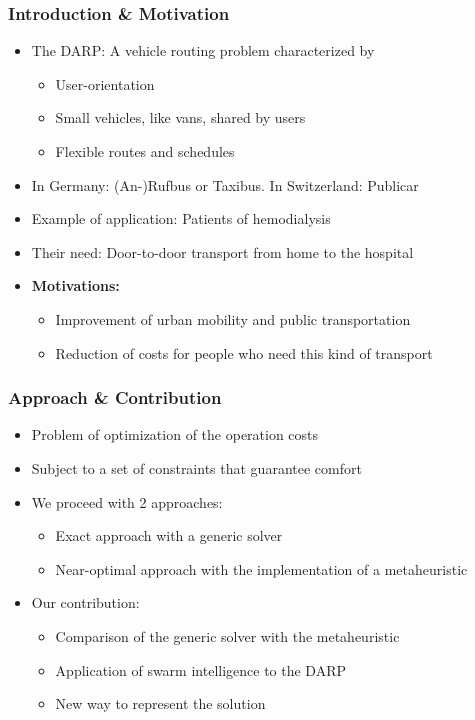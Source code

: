 \documentclass{beamer}
\begin{document}
\begin{frame}
\frametitle{Introduction \& Motivation}
\begin{itemize}
\item The DARP: A vehicle routing problem characterized by
	\begin{itemize}
	\item User-orientation
	\item Small vehicles, like vans, shared by users
	\item Flexible routes and schedules
	\end{itemize}
\item In Germany: (An-)Rufbus or Taxibus. In Switzerland: Publicar
\item Example of application: Patients of hemodialysis
\item Their need: Door-to-door transport from home to the hospital
\pause
\item \textbf{Motivations:}
	\begin{itemize}
	\item Improvement of urban mobility and public transportation
	\item Reduction of costs for people who need this kind of transport
	\end{itemize}
\end{itemize}
\end{frame}

\begin{frame}
\frametitle{Approach \& Contribution}
\begin{itemize}
\item Problem of optimization of the operation costs
\item Subject to a set of constraints that guarantee comfort
\pause
\item We proceed with 2 approaches:
	\begin{itemize}
	\item Exact approach with a generic solver
	\item Near-optimal approach with the implementation of a metaheuristic
	\end{itemize}
\pause
\item Our contribution:
	\begin{itemize}
	\item Comparison of the generic solver with the metaheuristic
	\item Application of swarm intelligence to the DARP
	\item New way to represent the solution
	\end{itemize}
\end{itemize}
\end{frame}
\end{document}
